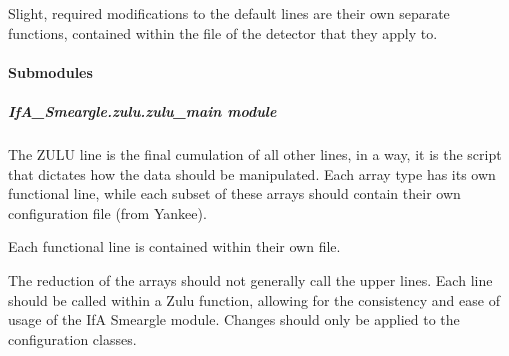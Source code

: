 \documentclass[letterpaper,10pt,english]{sphinxmanual}
\begin{document}
Slight, required modifications to the default lines are their own separate
functions, contained within the file of the detector that they apply to.


\paragraph{Submodules}
\label{\detokenize{python_docstrings/IfA_Smeargle.zulu:submodules}}

\subparagraph{IfA\_Smeargle.zulu.zulu\_main module}
\label{\detokenize{python_docstrings/IfA_Smeargle.zulu.zulu_main:module-IfA_Smeargle.zulu.zulu_main}}\label{\detokenize{python_docstrings/IfA_Smeargle.zulu.zulu_main:ifa-smeargle-zulu-zulu-main-module}}\label{\detokenize{python_docstrings/IfA_Smeargle.zulu.zulu_main::doc}}
The ZULU line is the final cumulation of all other lines, in a way, it is
the script that dictates how the data should be manipulated. Each array
type has its own functional line, while each subset of these arrays should
contain their own configuration file (from Yankee).

Each functional line is contained within their own file.

The reduction of the arrays should not generally call the upper lines.
Each line should be called within a Zulu function, allowing for the
consistency and ease of usage of the IfA Smeargle module. Changes should
only be applied to the configuration classes.
\end{document}
